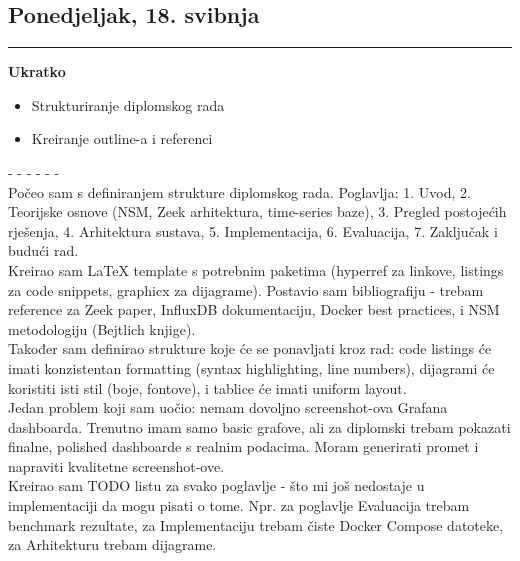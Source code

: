 \documentclass[12pt, a4paper]{article}
\newcommand{\dan}[1]{
    \subsection*{#1}
    \vspace{-0.5em} 
    \hrule \vspace{0.5em} 
}
\begin{document}
\dan{Ponedjeljak, 18. svibnja}
\textbf{Ukratko}
\begin{itemize}
    \item Strukturiranje diplomskog rada
    \item Kreiranje outline-a i referenci
\end{itemize}
- - - - - - \\
Počeo sam s definiranjem strukture diplomskog rada. Poglavlja: 1. Uvod, 2. Teorijske osnove (NSM, Zeek arhitektura, time-series baze), 3. Pregled postojećih rješenja, 4. Arhitektura sustava, 5. Implementacija, 6. Evaluacija, 7. Zaključak i budući rad.
\\
Kreirao sam LaTeX template s potrebnim paketima (hyperref za linkove, listings za code snippets, graphicx za dijagrame). Postavio sam bibliografiju - trebam reference za Zeek paper, InfluxDB dokumentaciju, Docker best practices, i NSM metodologiju (Bejtlich knjige).
\\
Također sam definirao strukture koje će se ponavljati kroz rad: code listings će imati konzistentan formatting (syntax highlighting, line numbers), dijagrami će koristiti isti stil (boje, fontove), i tablice će imati uniform layout.
\\
Jedan problem koji sam uočio: nemam dovoljno screenshot-ova Grafana dashboarda. Trenutno imam samo basic grafove, ali za diplomski trebam pokazati finalne, polished dashboarde s realnim podacima. Moram generirati promet i napraviti kvalitetne screenshot-ove.
\\
Kreirao sam TODO listu za svako poglavlje - što mi još nedostaje u implementaciji da mogu pisati o tome. Npr. za poglavlje Evaluacija trebam benchmark rezultate, za Implementaciju trebam čiste Docker Compose datoteke, za Arhitekturu trebam dijagrame.
\end{document}

